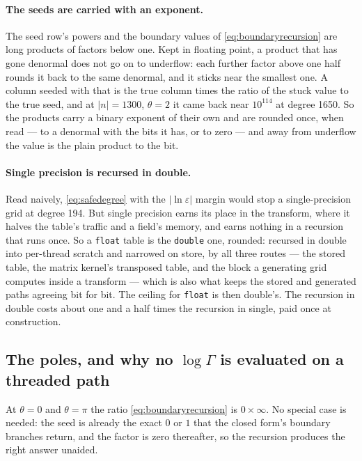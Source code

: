 \documentclass[11pt,a4paper]{article}
\newcommand{\code}[1]{\texttt{#1}}
\begin{document}
\paragraph{The seeds are carried with an exponent.}  The seed row's powers
and the boundary values of \eqref{eq:boundaryrecursion} are long products of
factors below one.  Kept in floating point, a product that has gone
denormal does not go on to underflow: each further factor above one half
rounds it back to the same denormal, and it sticks near the smallest one.
A column seeded with that is the true column times the ratio of the stuck
value to the true seed, and at $|n| = 1300$, $\theta = 2$ it came back near
$10^{114}$ at degree 1650.  So the products carry a binary exponent of their
own and are rounded once, when read --- to a denormal with the bits it has,
or to zero --- and away from underflow the value is the plain product to
the bit.

\paragraph{Single precision is recursed in double.}  Read naively,
\eqref{eq:safedegree} with the $|\ln\varepsilon|$ margin would stop a
single-precision grid at degree 194.  But single precision earns its place
in the transform, where it halves the table's traffic and a field's
memory, and earns nothing in a recursion that runs once.  So a
\code{float} table is the \code{double} one, rounded: recursed in double
into per-thread scratch and narrowed on store, by all three routes --- the
stored table, the matrix kernel's transposed table, and the block a
generating grid computes inside a transform --- which is also what keeps
the stored and generated paths agreeing bit for bit.  The ceiling for
\code{float} is then double's.  The recursion in double costs about one
and a half times the recursion in single, paid once at construction.

\subsection{The poles, and why no \texorpdfstring{$\log\Gamma$}{log Gamma}
is evaluated on a threaded path}
\label{sec:signgam}

At $\theta=0$ and $\theta=\pi$ the ratio \eqref{eq:boundaryrecursion} is
$0\times\infty$.  No special case is needed: the seed is already the exact
$0$ or $1$ that the closed form's boundary branches return, and the factor
is zero thereafter, so the recursion produces the right answer unaided.
\end{document}
